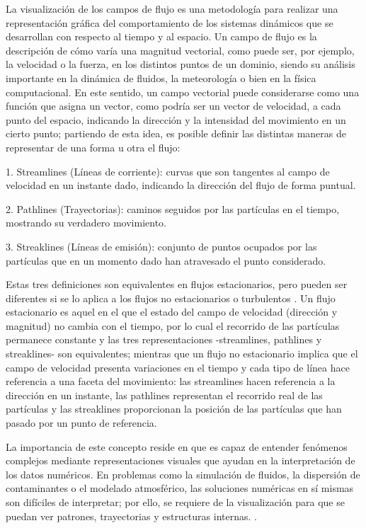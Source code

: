 La visualización de los campos de flujo es una metodología para realizar una representación gráfica del comportamiento de los sistemas dinámicos que se desarrollan con respecto al tiempo y al espacio. Un campo de flujo es la descripción de cómo varía una magnitud vectorial, como puede ser, por ejemplo, la velocidad o la fuerza, en los distintos puntos de un dominio, siendo su análisis importante en la dinámica de fluidos, la meteorología o bien en la física computacional.
En este sentido, un campo vectorial puede considerarse como una función que asigna un vector, como podría ser un vector de velocidad, a cada punto del espacio, indicando la dirección y la intensidad del movimiento en un cierto punto; partiendo de esta idea, es posible definir las distintas maneras de representar de una forma u otra el flujo:

1. Streamlines (Líneas de corriente): curvas que son tangentes al campo de velocidad en un instante dado, indicando la dirección del flujo de forma puntual.

2. Pathlines (Trayectorias): caminos seguidos por las partículas en el tiempo, mostrando su verdadero movimiento.

3. Streaklines (Líneas de emisión): conjunto de puntos ocupados por las partículas que en un momento dado han atravesado el punto considerado.

Estas tres definiciones son equivalentes en flujos estacionarios, pero pueden ser diferentes si se lo aplica a los flujos no estacionarios o turbulentos \cite{hansen_visualization_2005}. Un flujo estacionario es aquel en el que el estado del campo de velocidad (dirección y magnitud) no cambia con el tiempo, por lo cual el recorrido de las partículas permanece constante y las tres representaciones -streamlines, pathlines y streaklines- son equivalentes; mientras que un flujo no estacionario implica que el campo de velocidad presenta variaciones en el tiempo y cada tipo de línea hace referencia a una faceta del movimiento: las streamlines hacen referencia a la dirección en un instante, las pathlines representan el recorrido real de las partículas y las streaklines proporcionan la posición de las partículas que han pasado por un punto de referencia.

La importancia de este concepto reside en que es capaz de entender fenómenos complejos mediante representaciones visuales que ayudan en la interpretación de los datos numéricos. En problemas como la simulación de fluidos, la dispersión de contaminantes o el modelado atmosférico, las soluciones numéricas en sí mismas son difíciles de interpretar; por ello, se requiere de la visualización para que se puedan ver patrones, trayectorias y estructuras internas. \cite{laramee_state_2004}.

